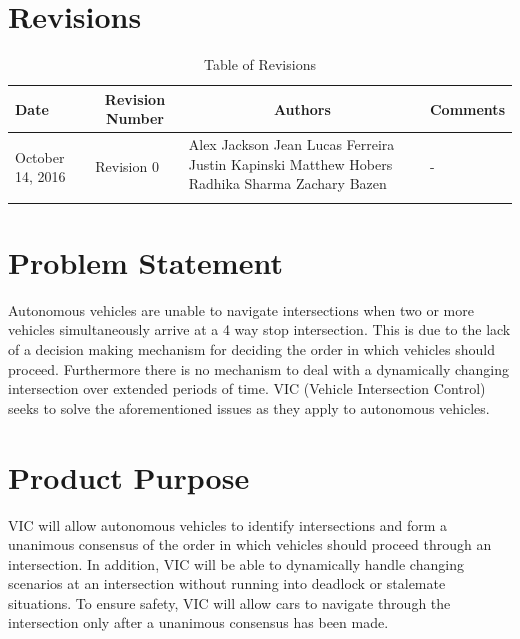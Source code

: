 \documentclass [12pt]{article}
\begin{document}

\tableofcontents
\listoftables

\pagebreak


\section{Revisions}
\begin{longtable}{| p{ } | p{ } | p{ } | p{ } |}

\hline 
\centering \textbf{Date} & 
\multicolumn{1}{c}{\textbf {Revision Number}} &
\multicolumn{1}{|c}{\textbf {Authors}} & 
\multicolumn{1}{|c|}{\textbf {Comments}} \\ \hline

\multirow{4}{*}{\centering October 14, 2016}  & 
\multirow{4}{*}{Revision 0}& 
{Alex Jackson \newline
		Jean Lucas Ferreira \newline
		Justin Kapinski\newline
		Matthew Hobers\newline
		Radhika Sharma\newline
		Zachary Bazen}
 &
\multirow{4}{*}{-} \\ 
\hline 

\caption{Table of Revisions} 
\end{longtable}

\pagebreak

\section{Problem Statement}
\indent\indent Autonomous vehicles are unable to navigate intersections when two or more vehicles simultaneously arrive at a 4 way stop intersection. This is due to the lack of a decision making mechanism for deciding the order in which vehicles should proceed.  Furthermore there is no mechanism to deal with a dynamically changing intersection over extended periods of time. VIC (Vehicle Intersection Control) seeks to solve the aforementioned issues as they apply to autonomous vehicles. 

\section{Product Purpose}
\indent\indent VIC will allow autonomous vehicles to identify intersections and form a unanimous consensus of the order in which vehicles should proceed through an intersection. In addition, VIC will be able to dynamically handle changing scenarios at an intersection without running into deadlock or stalemate situations. To ensure safety, VIC will allow cars to navigate through the intersection only after a unanimous consensus has been made.
\end{document}
